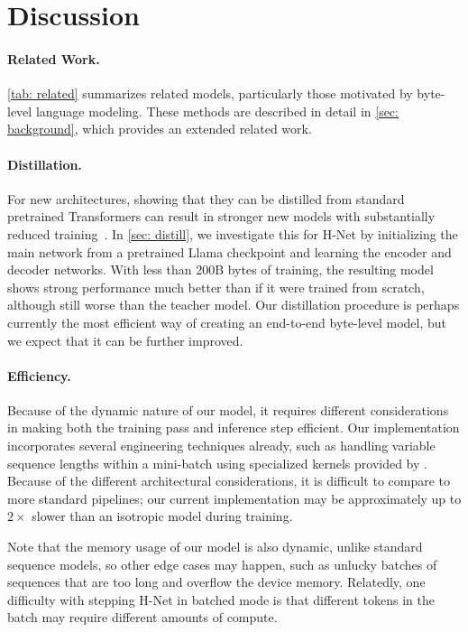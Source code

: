 \documentclass{article}
\newcommand{\citep}{\parencite}
\newcommand{\citet}{\textcite}
\newcommand{\model}{H-Net}
\theoremstyle{plain}
\theoremstyle{remark}
\begin{document}
\section{Discussion}
\label{sec: discussion}

\paragraph{Related Work.}
\cref{tab: related} summarizes related models, particularly those motivated by byte-level language modeling.
These methods are described in detail in \cref{sec: background}, which provides an extended related work.

\paragraph{Distillation.}
For new architectures,
showing that they can be distilled from standard pretrained Transformers can  result in stronger new models with substantially reduced training~\citep{MOHAWK}.
In \cref{sec: distill}, we investigate this for H-Net by initializing the main network from a pretrained Llama checkpoint and learning the encoder and decoder networks.
With less than 200B bytes of training, the resulting model shows strong performance much better than if it were trained from scratch, although still worse than the teacher model.
Our distillation procedure is perhaps currently the most efficient way of creating an end-to-end byte-level model, but we expect that it can be further improved.

\paragraph{Efficiency.}

Because of the dynamic nature of our model, it requires different considerations in making both the training pass and inference step efficient.
Our implementation incorporates several engineering techniques already, such as handling variable sequence lengths within a mini-batch using specialized kernels provided by \citet{FlashAttention2, Mamba2}.
Because of the different architectural considerations, it is difficult to compare to more standard pipelines;
our current implementation may be approximately up to $2\times$ slower than an isotropic model during training.

Note that the memory usage of our model is also dynamic, unlike standard sequence models, so other edge cases may happen, such as unlucky batches of sequences that are too long and overflow the device memory.
Relatedly, one difficulty with stepping \model{} in batched mode is that different tokens in the batch may require different amounts of compute.
\end{document}

